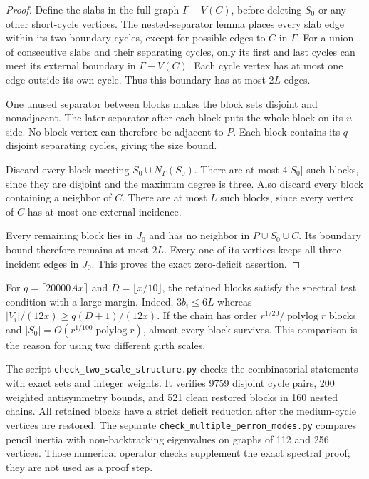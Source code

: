 \begin{proof}
Define the slabs in the full graph $\Gamma-V(C)$, before deleting $S_0$ or any other short-cycle vertices.
The nested-separator lemma places every slab edge within its two boundary cycles, except for possible edges to $C$ in $\Gamma$.
For a union of consecutive slabs and their separating cycles, only its first and last cycles can meet its external boundary in $\Gamma-V(C)$.
Each cycle vertex has at most one edge outside its own cycle.
Thus this boundary has at most $2L$ edges.

One unused separator between blocks makes the block sets disjoint and nonadjacent.
The later separator after each block puts the whole block on its $u$-side.
No block vertex can therefore be adjacent to $P$.
Each block contains its $q$ disjoint separating cycles, giving the size bound.

Discard every block meeting $S_0\cup N_\Gamma(S_0)$.
There are at most $4|S_0|$ such blocks, since they are disjoint and the maximum degree is three.
Also discard every block containing a neighbor of $C$.
There are at most $L$ such blocks, since every vertex of $C$ has at most one external incidence.

Every remaining block lies in $J_0$ and has no neighbor in $P\cup S_0\cup C$.
Its boundary bound therefore remains at most $2L$.
Every one of its vertices keeps all three incident edges in $J_0$.
This proves the exact zero-deficit assertion.
\end{proof}

For $q=\lceil20000Ax\rceil$ and $D=\lfloor x/10\rfloor$, the retained blocks satisfy the spectral test condition with a large margin.
Indeed, $3b_i\le6L$ whereas $|V_i|/(12x)\ge q(D+1)/(12x)$.
If the chain has order $r^{1/20}/\operatorname{polylog}r$ blocks and $|S_0|=O(r^{1/100}\operatorname{polylog}r)$, almost every block survives.
This comparison is the reason for using two different girth scales.

The script \texttt{check\_two\_scale\_structure.py} checks the combinatorial statements with exact sets and integer weights.
It verifies 9759 disjoint cycle pairs, 200 weighted antisymmetry bounds, and 521 clean restored blocks in 160 nested chains.
All retained blocks have a strict deficit reduction after the medium-cycle vertices are restored.
The separate \texttt{check\_multiple\_perron\_modes.py} compares pencil inertia with non-backtracking eigenvalues on graphs of 112 and 256 vertices.
Those numerical operator checks supplement the exact spectral proof; they are not used as a proof step.
